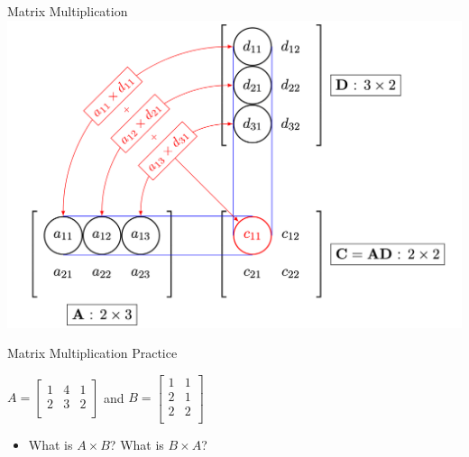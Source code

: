 \documentclass[aspectratio=43]{beamer}
\begin{document}
\begin{frame}{Matrix Multiplication}
  \includegraphics[width= \linewidth]{Matrix Multiplication.png}
\end{frame}



\begin{frame}{Matrix Multiplication Practice}
  \begin{center}
    $A = \begin{bmatrix}
        1 & 4 & 1 \\
        2 & 3 & 2 \\
      \end{bmatrix}$ and $B = \begin{bmatrix}
        1 & 1 \\
        2 & 1 \\
        2 & 2 \\
      \end{bmatrix}$
  \end{center}

  \begin{itemize}
    \item What is $A \times B$? What is $B \times A$?
  \end{itemize}

  \vspace{40mm}
\end{frame}
\end{document}
